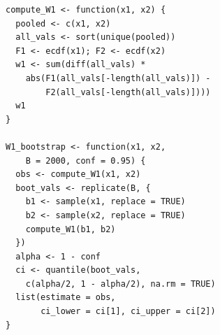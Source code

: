 \documentclass[AMA,Times1COL]{WileyNJDv5}
\begin{document}
\begin{lstlisting}[caption={R function for computing the Wasserstein-1 distance with bootstrap confidence intervals.},label=lst:nabcd,basicstyle=\fontsize{8}{10}\selectfont\ttfamily]
compute_W1 <- function(x1, x2) {
  pooled <- c(x1, x2)
  all_vals <- sort(unique(pooled))
  F1 <- ecdf(x1); F2 <- ecdf(x2)
  w1 <- sum(diff(all_vals) *
    abs(F1(all_vals[-length(all_vals)]) -
        F2(all_vals[-length(all_vals)])))
  w1
}

W1_bootstrap <- function(x1, x2,
    B = 2000, conf = 0.95) {
  obs <- compute_W1(x1, x2)
  boot_vals <- replicate(B, {
    b1 <- sample(x1, replace = TRUE)
    b2 <- sample(x2, replace = TRUE)
    compute_W1(b1, b2)
  })
  alpha <- 1 - conf
  ci <- quantile(boot_vals,
    c(alpha/2, 1 - alpha/2), na.rm = TRUE)
  list(estimate = obs,
       ci_lower = ci[1], ci_upper = ci[2])
}
\end{lstlisting}
\end{document}
